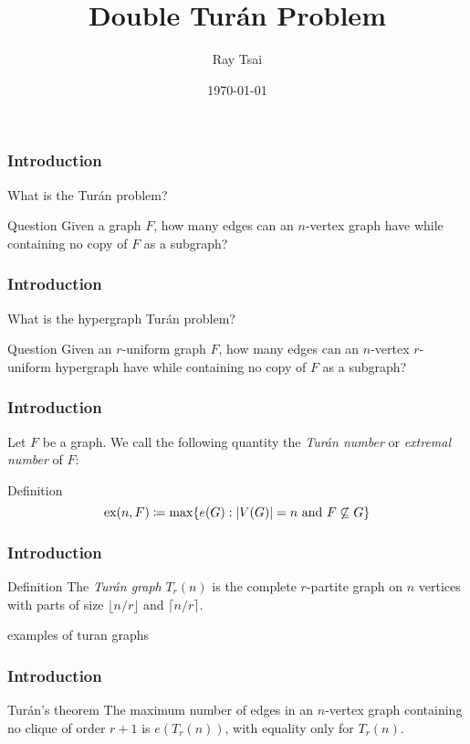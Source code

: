 \documentclass{beamer}
\title{Double Turán Problem}
\author{Ray Tsai}
\date{\today}
\newcommand*{\ex}{\textnormal{ex}}
\begin{document}
\frame{\titlepage}

\begin{frame}
\frametitle{Introduction}
What is the Turán problem? \pause

\begin{block}{Question}
  Given a graph $F$, how many edges can an $n$-vertex graph have while containing no copy of $F$ as a subgraph?
\end{block}
\end{frame}

\begin{frame}
\frametitle{Introduction}
What is the hypergraph Turán problem? 

\begin{block}{Question}
  Given an $r$-uniform graph $F$, how many edges can an $n$-vertex $r$-uniform hypergraph have while containing no copy of $F$ as a subgraph?
\end{block}
\end{frame}

\begin{frame}
\frametitle{Introduction}

Let $F$ be a graph. We call the following quantity the \textit{Turán number} or \textit{extremal number} of $F$:

\begin{block}{Definition}
  \[
    \ex(n, F) \coloneq \max \{ e(G) : |V(G)| = n \text{ and } F \not\subseteq G \}
  \]
\end{block}
\end{frame}

\begin{frame}
  \frametitle{Introduction}

  \begin{block}{Definition}
    The \textit{Turán graph} $T_r(n)$ is the complete $r$-partite graph on $n$ vertices with parts of size $\lfloor n/r \rfloor$ and $\lceil n/r \rceil$.
  \end{block}

  \pause

  examples of turan graphs
\end{frame}

\begin{frame}
  \frametitle{Introduction}

  \begin{block}{Turán's theorem}
    The maximum number of edges in an $n$-vertex graph containing no clique of order $r + 1$ is $e(T_r(n))$, with equality only for $T_r(n)$.
  \end{block}
\end{frame}
\end{document}
